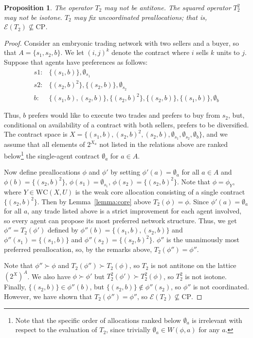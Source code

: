 \documentclass[11pt,reqno]{amsart}
\newtheorem{prop}[thm]{Proposition}
\theoremstyle{definition}
\numberwithin{equation}{section}
\newcommand{\prf}{\begin{proof}}
\newcommand{\eprf}{\end{proof}}
\newcommand{\pre}{\phi}
\newcommand{\coordpre}{\mathrm{CP}}
\newcommand{\prealloc}{(2^X)^A}
\newcommand{\sub}{\subseteq}
\newcommand{\core}{\mathrm{WC}(X,U)}
\newcommand{\fix}{\mathcal{E}}
\newcommand{\su}{\succ}
\newcommand{\optwo}{T_2}
\begin{document}
\begin{prop} \label{prop:maxdom}
The operator $\optwo$ may not be antitone.
The squared operator $\optwo^2$ may not be isotone.
$\optwo$ may fix uncoordinated preallocations; that is, $\fix(\optwo) \not \sub \coordpre$.
\end{prop}
\prf 
Consider an embryonic trading network with two sellers and a buyer, so that $A = \{s_1,s_2,b\}$. 
We let $(i,j)^k$ denote the contract where $i$ sells $k$ units to $j$.
Suppose that agents have preferences as follows:
\begin{align*}
s1:& \{(s_1,b)\}, \emptyset_{s_1} \\
s2:& \{(s_2,b)^2\}, \{(s_2,b)\}, \emptyset_{s_2} \\
b:& \{(s_1,b), (s_2,b) \}, \{(s_2,b)^2\}, \{(s_2,b)\}, \{(s_1,b)\}, \emptyset_b
\end{align*}

Thus, $b$ prefers would like to execute two trades and prefers to buy from $s_2$, but, conditional on availability of a contract with both sellers, prefers to be diversified.
The contract space is $X = \{(s_1,b), (s_2,b)^2, (s_2,b), \emptyset_{s_1}, \emptyset_{s_2}, \emptyset_b\}$, and we assume that all elements of $2^{X_a}$ not listed in the relations above are ranked below\footnote{Note that the specific order of allocations ranked below $\emptyset_a$ is irrelevant with respect to the evaluation of $\optwo$, since trivially $\emptyset_a \in W(\pre,a)$ for any $a$.} the single-agent contract $\emptyset_a$ for $a \in A$.

Now define preallocations $\pre$ and $\pre'$ by setting $\pre'(a) = \emptyset_a$ for all $a \in A$ and $\pre(b) = \{(s_2,b)^2\}$, $\pre(s_1) = \emptyset_{s_1}$, $\pre(s_2) = \{(s_2,b)^2\}$.
Note that $\pre = \pre_Y$, where $Y \in \core$ is the weak core allocation consisting of a single contract $\{(s_2,b)^2\}$. 
Then by Lemma~\ref{lemma:core} above $\optwo(\pre) = \pre$.
Since $\pre'(a) = \emptyset_a$ for all $a$, any trade listed above is a strict improvement for each agent involved, so every agent can propose its most preferred network structure.
Thus, we get $\pre'' = \optwo(\pre')$ defined by $\pre''(b) = \{(s_1,b),(s_2,b)\}$ and $\pre''(s_1) = \{(s_1,b)\}$ and $\pre''(s_2) = \{(s_2,b)^2\}$.
$\pre''$ is the unanimously most preferred preallocation, so, by the remarks above, $\optwo(\pre'') = \pre''$.

Note that $\pre'' \su \pre$ and $\optwo(\pre'') \su \optwo(\pre)$, so $\optwo$ is not antitone on the lattice $\prealloc$.
We also have $\pre \su \pre'$ but $\optwo^2(\pre') \su \optwo^2(\pre)$, so $\optwo^2$ is not isotone.
Finally, $ \{(s_2,b)\} \in \pre''(b)$, but $\{(s_2,b)\} \not \in \pre''(s_2)$, so $\pre''$ is not coordinated.
However, we have shown that $\optwo(\pre'') = \pre''$, so $\fix(\optwo) \not \sub \coordpre$.
\eprf
\end{document}
